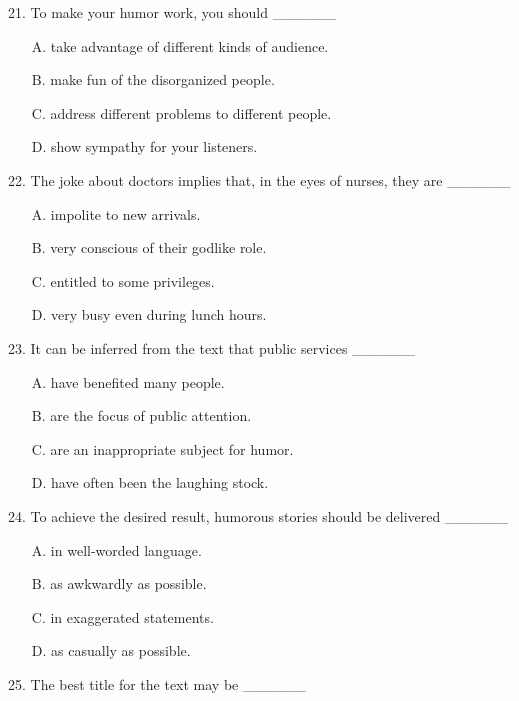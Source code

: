 \documentclass[UTF8,11pt]{ctexart}
\begin{document}
21. To make your humor work, you should \_\_\_\_\_\_


\begin{itemize}[leftmargin=2em,itemsep=.2em,topsep=.4em]\item[A.] take advantage of different kinds of audience.
\item[B.] make fun of the disorganized people.
\item[C.] address different problems to different people.
\item[D.] show sympathy for your listeners.
\end{itemize}

22. The joke about doctors implies that, in the eyes of nurses, they are \_\_\_\_\_\_


\begin{itemize}[leftmargin=2em,itemsep=.2em,topsep=.4em]\item[A.] impolite to new arrivals.
\item[B.] very conscious of their godlike role.
\item[C.] entitled to some privileges.
\item[D.] very busy even during lunch hours.
\end{itemize}

23. It can be inferred from the text that public services \_\_\_\_\_\_


\begin{itemize}[leftmargin=2em,itemsep=.2em,topsep=.4em]\item[A.] have benefited many people.
\item[B.] are the focus of public attention.
\item[C.] are an inappropriate subject for humor.
\item[D.] have often been the laughing stock.
\end{itemize}

24. To achieve the desired result, humorous stories should be delivered \_\_\_\_\_\_


\begin{itemize}[leftmargin=2em,itemsep=.2em,topsep=.4em]\item[A.] in well-worded language.
\item[B.] as awkwardly as possible.
\item[C.] in exaggerated statements.
\item[D.] as casually as possible.
\end{itemize}

25. The best title for the text may be \_\_\_\_\_\_
\end{document}
